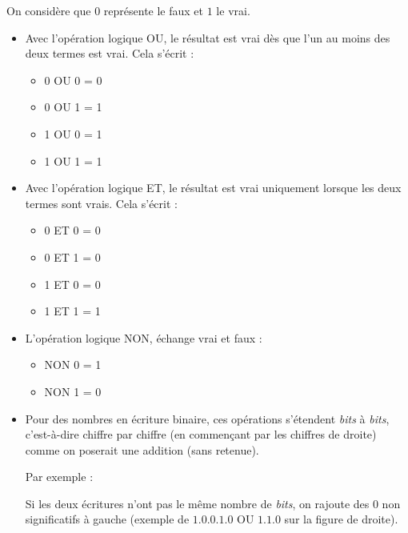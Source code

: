 \documentclass[11pt,class=report,crop=false]{standalone}
\begin{document}
\begin{cours}


On considère que $0$ représente le \og{}faux\fg{} et $1$ le \og{}vrai\fg{}. 
\begin{itemize}
  \item Avec l'opération logique \og{}OU\fg{}, le résultat est vrai dès que l'un au moins des deux termes est vrai. Cela s'écrit :
  \begin{itemize}
    \item 0 OU 0 = 0
    \item 0 OU 1 = 1
    \item 1 OU 0 = 1
    \item 1 OU 1 = 1
   \end{itemize}
   
  \item Avec l'opération logique \og{}ET\fg{}, le résultat est vrai uniquement lorsque les deux termes sont vrais. Cela s'écrit :
  \begin{itemize}
    \item 0 ET 0 = 0
    \item 0 ET 1 = 0
    \item 1 ET 0 = 0
    \item 1 ET 1 = 1
   \end{itemize}  
   
  \item L'opération logique \og{}NON\fg{}, échange vrai et faux :
  \begin{itemize}
    \item NON 0 = 1
    \item NON 1 = 0
   \end{itemize}
   
    \item Pour des nombres en écriture binaire, ces opérations s'étendent \emph{bits} à \emph{bits}, c'est-à-dire chiffre par chiffre (en commençant par les chiffres de droite) comme on poserait une addition (sans retenue). 
    
 Par exemple : 
    

Si les deux écritures n'ont pas le même nombre de \emph{bits}, on rajoute des $0$ non significatifs à gauche (exemple de $1.0.0.1.0$ OU $1.1.0$ sur la figure de droite).
\end{itemize}  
  
   

\end{cours}
\end{document}
